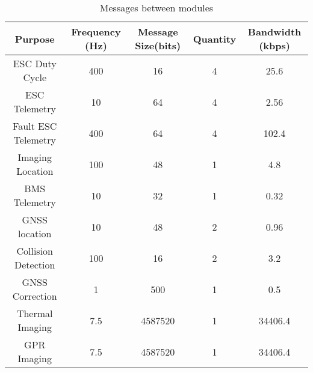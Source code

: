 \begin{table}[h]
\centering
\begin{tabular}{|c|c|c|c|c|} 
\hline
\textbf{Purpose}&\textbf{Frequency (Hz)}&\textbf{Message Size(bits)}&\textbf{Quantity}&\textbf{Bandwidth (kbps)}\\
\hline
ESC Duty Cycle&400&16&4&25.6\\
ESC Telemetry&10&64&4&2.56\\
Fault ESC Telemetry&400&64&4&102.4\\
Imaging Location&100&48&1&4.8\\
BMS Telemetry&10&32&1&0.32\\
GNSS location&10&48&2&0.96\\
Collision Detection&100&16&2&3.2\\
GNSS Correction&1&500&1&0.5\\
Thermal Imaging&7.5&4587520&1&34406.4\\
GPR Imaging&7.5&4587520&1&34406.4\\
\hline
\end{tabular}
\caption{Messages between modules}
\label{tab:messages}
\end{table}
